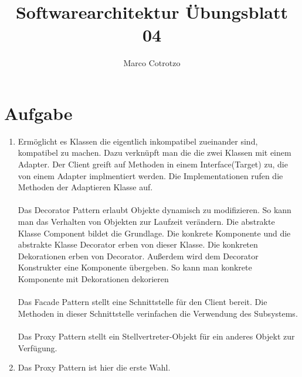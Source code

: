 \documentclass[]{article}
\title{Softwarearchitektur Übungsblatt 04}
\author{Marco Cotrotzo}
\date{}
\begin{document}
	\maketitle
\renewcommand{\labelenumi}{\alph{enumi})}
\section{Aufgabe}
\begin{enumerate}
	\item Ermöglicht es Klassen die eigentlich inkompatibel zueinander sind, kompatibel zu machen. Dazu verknüpft man die die zwei Klassen mit einem Adapter. Der Client greift auf Methoden in einem Interface(Target) zu, die von einem Adapter implmentiert werden. Die Implementationen rufen die Methoden der Adaptieren Klasse auf.\\\\
	Das Decorator Pattern erlaubt Objekte dynamisch zu modifizieren. So kann man das Verhalten von Objekten zur Laufzeit verändern. Die abstrakte Klasse Component bildet die Grundlage. Die konkrete Komponente und die abstrakte Klasse Decorator erben von dieser Klasse. Die  konkreten Dekorationen erben von Decorator. Außerdem wird dem Decorator Konstrukter eine Komponente übergeben. So kann man konkrete Komponente mit Dekorationen dekorieren\\\\
	Das Facade Pattern stellt eine Schnittstelle für den Client bereit. Die Methoden in dieser Schnittstelle verinfachen die Verwendung des Subsystems.\\\\
	Das Proxy Pattern stellt ein Stellvertreter-Objekt für ein anderes Objekt zur Verfügung.
	\item 
	Das Proxy Pattern ist hier die erste Wahl.
	   
\end{enumerate}
\end{document}
